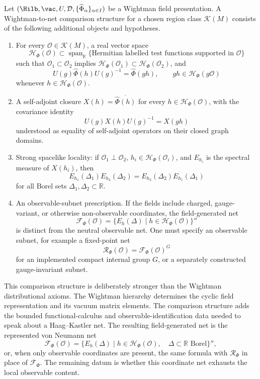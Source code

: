 \begin{definition}
\label{def:wightman-to-net-comparison-structure}
Let
\((\Hilb,\vac,U,\mathcal D,\{\widehat\Phi_\alpha\}_{\alpha\in I})\)
be a Wightman field presentation.  A Wightman-to-net comparison structure for a
chosen region class \(\mathcal K(M)\) consists of the following additional
objects and hypotheses.
\begin{enumerate}[label=\textup{(\roman*)}]
\item For every \(\mathcal O\in\mathcal K(M)\), a real vector space
\[
  \mathcal H_\Phi(\mathcal O)
  \subset
  \operatorname{span}_{\mathbb R}
  \{\text{Hermitian labelled test functions supported in }\mathcal O\}
\]
such that
\(\mathcal O_1\subset\mathcal O_2\) implies
\(\mathcal H_\Phi(\mathcal O_1)\subset\mathcal H_\Phi(\mathcal O_2)\), and
\[
  U(g)\widehat\Phi(h)U(g)^{-1}=\widehat\Phi(gh),
  \qquad
  gh\in\mathcal H_\Phi(g\mathcal O)
\]
whenever \(h\in\mathcal H_\Phi(\mathcal O)\).
\item A self-adjoint closure \(X(h)=\overline{\widehat\Phi(h)}\) for every
\(h\in\mathcal H_\Phi(\mathcal O)\), with the covariance identity
\[
  U(g)X(h)U(g)^{-1}=X(gh)
\]
understood as equality of self-adjoint operators on their closed graph
domains.
\item Strong spacelike locality: if
\(\mathcal O_1\perp\mathcal O_2\),
\(h_i\in\mathcal H_\Phi(\mathcal O_i)\), and
\(E_{h_i}\) is the spectral measure of \(X(h_i)\), then
\begin{equation}
  E_{h_1}(\Delta_1)E_{h_2}(\Delta_2)
  =
  E_{h_2}(\Delta_2)E_{h_1}(\Delta_1)
  \label{eq:wightman-net-strong-locality-condition}
\end{equation}
for all Borel sets \(\Delta_1,\Delta_2\subset\mathbb R\).
\item An observable-subnet prescription.  If the fields include charged,
gauge-variant, or otherwise non-observable coordinates, the field-generated
net
\[
  \mathcal F_\Phi(\mathcal O)
  =
  \{E_h(\Delta)\mid h\in\mathcal H_\Phi(\mathcal O)\}''
\]
is distinct from the neutral observable net.  One must specify an observable
subnet, for example a fixed-point net
\[
  \mathcal R_\Phi(\mathcal O)=\mathcal F_\Phi(\mathcal O)^G
\]
for an implemented compact internal group \(G\), or a separately constructed
gauge-invariant subnet.
\end{enumerate}
\end{definition}

This comparison structure is deliberately stronger than the Wightman
distributional axioms.
The Wightman hierarchy determines the cyclic field representation and its
vacuum matrix elements.  The comparison structure adds the bounded
functional-calculus and observable-identification data needed to speak about a
Haag--Kastler net.  The resulting field-generated net is the represented
von Neumann net
\[
  \mathcal F_\Phi(\mathcal O)
  =
  \{E_h(\Delta)\mid
    h\in\mathcal H_\Phi(\mathcal O),\quad
    \Delta\subset\mathbb R\text{ Borel}\}'',
\]
or, when only observable coordinates are present, the same formula with
\(\mathcal R_\Phi\) in place of \(\mathcal F_\Phi\).  The remaining datum is
whether this coordinate net exhausts the local observable content.

